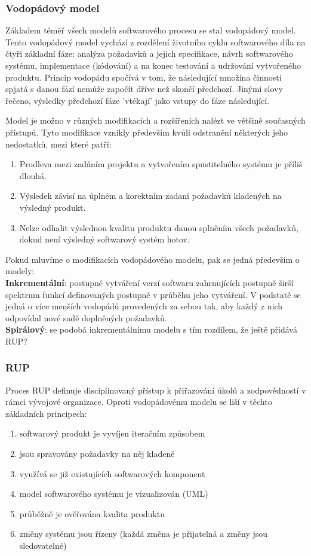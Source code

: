 \subsubsection{Vodopádový model}
Základem téměř všech modelů softwarového procesu se stal vodopádový model. Tento vodopádový model vychází z rozdělení životního cyklu softwarového díla na čtyři základní fáze: analýza požadavků a jejich specifikace, návrh softwarového systému, implementace (kódování) a na konec testování a udržování vytvořeného produktu.  Princip vodopádu spočívá v tom, že následující množina činností spjatá s danou fází nemůže započít dříve než skončí předchozí.  Jinými slovy řečeno, výsledky předchozí fáze 'vtékají' jako vstupy do fáze následující.

Model je možno v různých modifikacích a rozšířeních nalézt ve většině současných přístupů. Tyto modifikace vznikly především kvůli odstranění některých jeho nedostatků, mezi které patří:
\begin{enumerate}
\item Prodleva mezi zadáním projektu a vytvořením spustitelného systému je příliš dlouhá.
\item Výsledek závisí na úplném a korektním zadaní požadavků kladených na výsledný produkt.
\item Nelze odhalit výslednou kvalitu produktu danou splněním všech požadavků, dokud není výsledný softwarový systém hotov.
\end{enumerate}
Pokud mluvíme o modifikacích vodopádového modelu, pak se jedná především o modely:\\
\textbf{Inkrementální}: postupné vytváření verzí softwaru zahrnujících postupně širší spektrum funkcí definovaných postupně v průběhu jeho vytváření. V podstatě se jedná o více menších vodopádů provedených za sebou tak, aby každý z nich odpovídal nové sadě doplněných požadavků.\\
\textbf{Spirálový}: se podobá inkrementálnímu modelu s tím rozdílem, že ještě přidává RUP?

\subsubsection{RUP}
Proces RUP definuje disciplinovaný přístup k přiřazování úkolů a zodpovědností v rámci vývojové organizace.  Oproti vodopádovému modelu se liší v těchto základních principech:
\begin{enumerate}
\item softwarový produkt je vyvíjen iteračním způsobem 
\item jsou spravovány požadavky na něj kladené 
\item využívá se již existujících softwarových komponent 
\item model softwarového systému je vizualizován (UML)
\item průběžně je ověřována kvalita produktu 
\item změny systému jsou řízeny (každá změna je přijatelná a změny jsou sledovatelné)
\end{enumerate}

